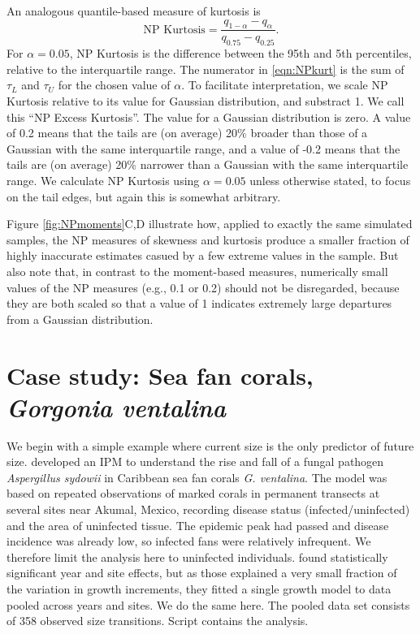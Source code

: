 \documentclass[11pt]{article}
\newcounter{box}
\newcommand{\be}{\begin{equation}}
\newcommand{\ee}{\end{equation}}
\begin{document}
{An analogous quantile-based measure of kurtosis \citep{jones-etal-1994} is 
\be
\mbox{NP Kurtosis}  = \frac{q_{1-\alpha} - q_{\alpha}}{q_{0.75} - q_{0.25}}.
\label{eqn:NPkurt}
\ee
For $\alpha=0.05$, NP Kurtosis is the difference between the 95th and 5th percentiles, relative to the interquartile range. 
The numerator in \eqref{eqn:NPkurt} is the sum of $\tau_L$ and $\tau_U$ for the chosen value of $\alpha$. 
To facilitate interpretation, we scale NP Kurtosis relative to its value for Gaussian distribution, and substract 1. 
We call this ``NP Excess Kurtosis''. The value for a Gaussian distribution is zero. A value of 0.2 means that the tails
are (on average) 20\% broader than those of a Gaussian with the same interquartile range, and a value of -0.2 means that the tails
are (on average) 20\% narrower than a Gaussian with the same interquartile range. We calculate NP Kurtosis using $\alpha=0.05$ 
unless otherwise stated, to focus on the tail edges, but again this is somewhat arbitrary. 

Figure \ref{fig:NPmoments}C,D illustrate how, applied to exactly the same simulated samples, the NP measures of skewness and
kurtosis produce a smaller fraction of highly inaccurate estimates casued by a few extreme values in the sample. But also note
that, in contrast to the moment-based measures, numerically small values of the NP measures (e.g., 0.1 or 0.2) should not be
disregarded, because they are both scaled so that a value of 1 indicates extremely large departures from a Gaussian distribution. 

\section{Case study: Sea fan corals, \emph{Gorgonia ventalina}}
We begin with a simple example where current size is the only predictor of future size. \cite{bruno-etal-2011} developed
an IPM to understand the rise and fall of a fungal pathogen \emph{Aspergillus sydowii} in Caribbean sea fan corals 
\emph{G. ventalina}. The model was based on repeated observations of marked corals in permanent transects at several sites 
near Akumal, Mexico, recording disease status (infected/uninfected) and the area of uninfected tissue. 
The epidemic peak had passed and disease incidence was already low, so infected fans were relatively infrequent. 
We therefore limit the analysis here to uninfected individuals. \citet{bruno-et-al-2011} found statistically significant year
and site effects, but as those explained a very small fraction of the variation in growth increments, they fitted a single growth
model to data pooled across years and sites. We do the same here. The pooled data set consists of 358 observed
size transitions. Script  contains the analysis. 

}
\end{document}
